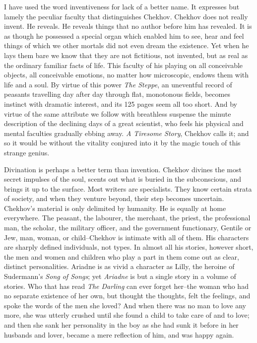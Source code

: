I have used the word inventiveness for lack of a better name. It
expresses but lamely the peculiar faculty that distinguishes Chekhov.
Chekhov does not really invent. He reveals. He reveals things that no
author before him has revealed. It is as though he possessed a special
organ which enabled him to see, hear and feel things of which we other
mortals did not even dream the existence. Yet when he lays them bare
we know that they are not fictitious, not invented, but as real as the
ordinary familiar facts of life. This faculty of his playing on all
conceivable objects, all conceivable emotions, no matter how
microscopic, endows them with life and a soul. By virtue of this power
\emph{The Steppe}, an uneventful record of peasants travelling day after
day through flat, monotonous fields, becomes instinct with dramatic
interest, and its 125 pages seem all too short. And by virtue of the
same attribute we follow with breathless suspense the minute
description of the declining days of a great scientist, who feels his
physical and mental faculties gradually ebbing away. \emph{A Tiresome
Story}, Chekhov calls it; and so it would be without the vitality
conjured into it by the magic touch of this strange genius.

Divination is perhaps a better term than invention. Chekhov divines
the most secret impulses of the soul, scents out what is buried in the
subconscious, and brings it up to the surface. Most writers are
specialists. They know certain strata of society, and when they
venture beyond, their step becomes uncertain. Chekhov's material is
only delimited by humanity. He is equally at home everywhere. The
peasant, the labourer, the merchant, the priest, the professional man,
the scholar, the military officer, and the government functionary,
Gentile or Jew, man, woman, or child--Chekhov is intimate with all of
them. His characters are sharply defined individuals, not types. In
almost all his stories, however short, the men and women and children
who play a part in them come out as clear, distinct personalities.
Ariadne is as vivid a character as Lilly, the heroine of Sudermann's
\emph{Song of Songs}; yet \emph{Ariadne} is but a single story in a volume of
stories. Who that has read \emph{The Darling} can ever forget her--the
woman who had no separate existence of her own, but thought the
thoughts, felt the feelings, and spoke the words of the men she loved?
And when there was no man to love any more, she was utterly crushed
until she found a child to take care of and to love; and then she sank
her personality in the boy as she had sunk it before in her husbands
and lover, became a mere reflection of him, and was happy again.

